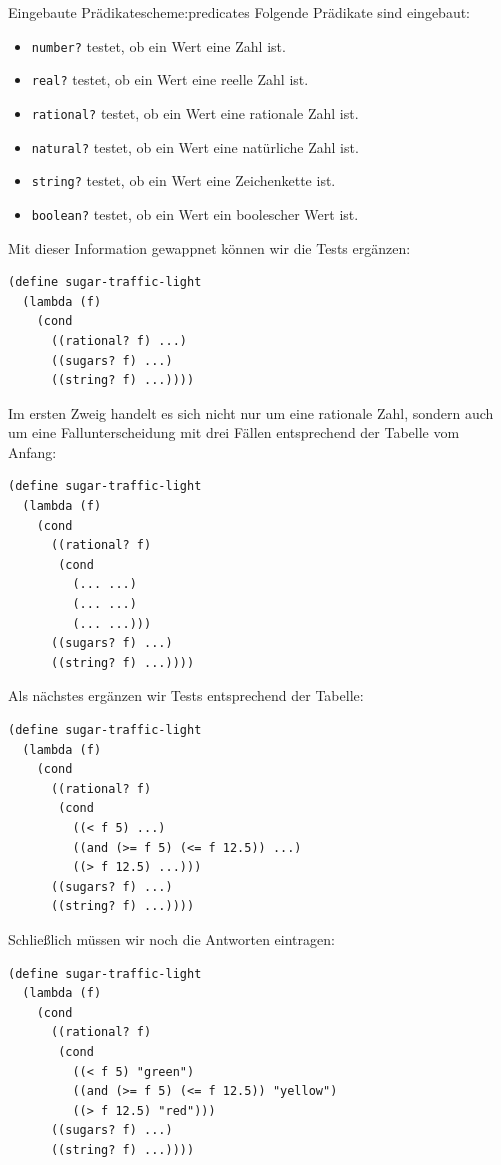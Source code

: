 \begin{feature}{Eingebaute Prädikate}{scheme:predicates}
  Folgende Prädikate sind eingebaut:
  \begin{itemize}
  \item \texttt{number?} testet, ob ein Wert eine Zahl ist.
  \item \texttt{real?} testet, ob ein Wert eine reelle Zahl ist.
  \item \texttt{rational?} testet, ob ein Wert eine rationale Zahl ist.
  \item \texttt{natural?} testet, ob ein Wert eine natürliche Zahl ist.
  \item \texttt{string?} testet, ob ein Wert eine Zeichenkette ist.
  \item \texttt{boolean?} testet, ob ein Wert ein boolescher Wert ist.
  \end{itemize}
\end{feature}
%
Mit dieser Information gewappnet können wir die Tests ergänzen:
%
\begin{verbatim}
(define sugar-traffic-light
  (lambda (f)
    (cond
      ((rational? f) ...)
      ((sugars? f) ...)
      ((string? f) ...))))
\end{verbatim}         
%
Im ersten Zweig handelt es sich nicht nur um eine rationale Zahl,
sondern auch um eine Fallunterscheidung mit drei Fällen entsprechend
der Tabelle vom Anfang:
%
\begin{verbatim}
(define sugar-traffic-light
  (lambda (f)
    (cond
      ((rational? f) 
       (cond
         (... ...)
         (... ...)
         (... ...)))
      ((sugars? f) ...)
      ((string? f) ...))))
\end{verbatim}         
%
Als nächstes ergänzen wir Tests entsprechend der Tabelle:
%
\begin{verbatim}
(define sugar-traffic-light
  (lambda (f)
    (cond
      ((rational? f) 
       (cond
         ((< f 5) ...)
         ((and (>= f 5) (<= f 12.5)) ...)
         ((> f 12.5) ...)))
      ((sugars? f) ...)
      ((string? f) ...))))
\end{verbatim}         
%
Schließlich müssen wir noch die Antworten eintragen:
%
\begin{verbatim}
(define sugar-traffic-light
  (lambda (f)
    (cond
      ((rational? f) 
       (cond
         ((< f 5) "green")
         ((and (>= f 5) (<= f 12.5)) "yellow")
         ((> f 12.5) "red")))
      ((sugars? f) ...)
      ((string? f) ...))))
\end{verbatim}         
